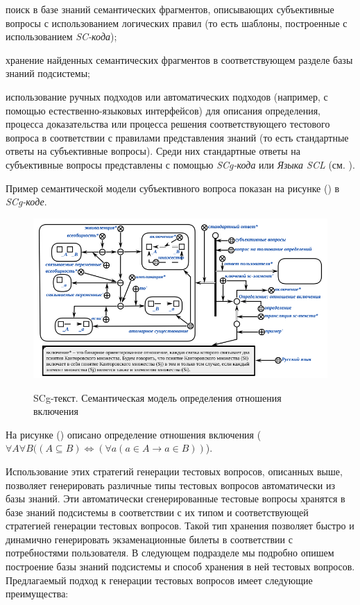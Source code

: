 \begin{textitemize}
	\item поиск в базе знаний семантических фрагментов, описывающих субъективные вопросы с использованием логических правил (то есть шаблоны, построенные с использованием \textit{SC-кода});
	\item хранение найденных семантических фрагментов в соответствующем разделе базы знаний подсистемы;
	\item использование ручных подходов или автоматических подходов (например, с помощью естественно-языковых интерфейсов) для описания определения, процесса доказательства или процесса решения соответствующего тестового вопроса в соответствии с правилами представления знаний (то есть стандартные ответы на субъективные вопросы). Среди них стандартные ответы на субъективные вопросы представлены с помощью \textit{SCg-кода} или \textit{Языка SCL} (см. ).
	
\end{textitemize}

Пример семантической модели субъективного вопроса показан на рисунке (\textit{}) в \textit{SCg-коде}.

\begin{figure}[H]
	\caption{SCg-текст. Семантическая модель определения отношения включения}
	\includegraphics[scale=0.8]{author/part7/figures/DI_question_example.png}
	\label{fig:DI_example}
\end{figure}

На рисунке (\textit{}) описано определение отношения включения ($\forall A\forall B((A\subseteq B)\Longleftrightarrow (\forall a(a\in A\rightarrow a\in B))$).

Использование этих стратегий генерации тестовых вопросов, описанных выше, позволяет генерировать различные типы тестовых вопросов автоматически из базы знаний. Эти автоматически сгенерированные тестовые вопросы хранятся в базе знаний подсистемы в соответствии с их типом и соответствующей стратегией генерации тестовых вопросов. Такой тип хранения позволяет быстро и динамично генерировать экзаменационные билеты в соответствии с потребностями пользователя. В следующем подразделе мы подробно опишем построение базы знаний подсистемы и способ хранения в ней тестовых вопросов. Предлагаемый подход к генерации тестовых вопросов имеет следующие преимущества:

